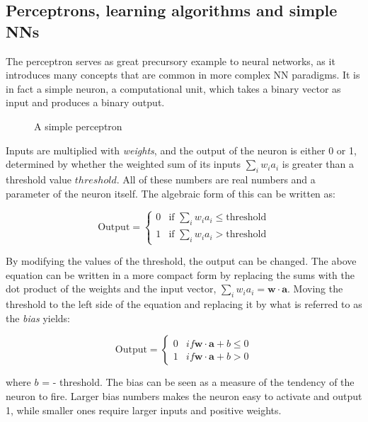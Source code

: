 \subsection{Perceptrons, learning algorithms and simple NNs}\label{sec:perceptron}

The perceptron serves as great precursory example to
neural networks, as it introduces many concepts that are
common in more complex NN paradigms. It is in fact a simple
neuron, a computational unit, which takes a binary vector
as input and produces a binary output.

\begin{figure}[h!]
  \centering
  
  \label{fig:simple_perceptron}
  \caption{A simple perceptron}
\end{figure}


Inputs are multiplied with \textit{weights}, and the output
of the neuron is either 0 or 1, determined by whether the
weighted sum of its inputs $\sum_i w_i a_i$ is greater than
a threshold value $threshold$. All of these numbers are real numbers
and a parameter of the neuron itself. The algebraic form of
this can be written as:



\begin{equation*}
  \text{Output} = \begin{cases}
    0 &\text{if } \sum_i w_i a_i \leq \text{threshold} \\
    1 &\text{if } \sum_i w_i a_i > \text{threshold}
  \end{cases}
\end{equation*}

By modifying the values of the threshold, the output
can be changed. The above equation can be written in
a more compact form by replacing the sums with the dot
product of the weights and the input vector,
$\sum_i w_i a_i = \bm{w} \cdot \bm{a}$. Moving
the threshold to the left side of the equation
and replacing it by what is referred to as the \textit{bias}
yields:

\begin{equation*}
  \text{Output} = \begin{cases}
    0 & if \bm{w} \cdot \bm{a} + b \leq 0 \\
    1 & if \bm{w} \cdot \bm{a} + b > 0
  \end{cases}
\end{equation*}

where $b$ = - threshold. The bias can be seen as a measure
of the tendency of the neuron to fire. Larger bias numbers
makes the neuron easy to activate and output 1, while smaller
ones require larger inputs and positive weights. 

